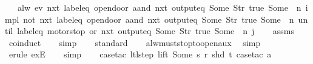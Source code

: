 \begin{isabellebody}
{\ \ \ {\isachardoublequoteopen}alw\ {\isacharparenleft}{\isacharparenleft}ev\ {\isacharparenleft}nxt\ {\isacharparenleft}{\isacharparenleft}label{\isacharunderscore}eq\ {\isacharprime}{\isacharprime}opendoor{\isacharprime}{\isacharprime}{\isacharparenright}\ aand\ {\isacharparenleft}nxt\ {\isacharparenleft}output{\isacharunderscore}eq\ {\isacharbrackleft}Some\ {\isacharparenleft}Str\ {\isacharprime}{\isacharprime}true{\isacharprime}{\isacharprime}{\isacharparenright}{\isacharcomma}\ Some\ \ n{\isacharbrackright}{\isacharparenright}{\isacharparenright}{\isacharparenright}{\isacharparenright}{\isacharparenright}\ impl\ {\isacharparenleft}{\isacharparenleft}not\ {\isacharparenleft}nxt\ {\isacharparenleft}{\isacharparenleft}label{\isacharunderscore}eq\ {\isacharprime}{\isacharprime}opendoor{\isacharprime}{\isacharprime}{\isacharparenright}\ aand\ {\isacharparenleft}nxt\ {\isacharparenleft}output{\isacharunderscore}eq\ {\isacharbrackleft}Some\ {\isacharparenleft}Str\ {\isacharprime}{\isacharprime}true{\isacharprime}{\isacharprime}{\isacharparenright}{\isacharcomma}\ Some\ \ n{\isacharbrackright}{\isacharparenright}{\isacharparenright}{\isacharparenright}{\isacharparenright}{\isacharparenright}\ until\ {\isacharparenleft}{\isacharparenleft}{\isacharparenleft}label{\isacharunderscore}eq\ {\isacharprime}{\isacharprime}motorstop{\isacharprime}{\isacharprime}{\isacharparenright}\ or\ {\isacharparenleft}nxt\ {\isacharparenleft}output{\isacharunderscore}eq\ {\isacharbrackleft}Some\ {\isacharparenleft}Str\ {\isacharprime}{\isacharprime}true{\isacharprime}{\isacharprime}{\isacharparenright}{\isacharcomma}\ Some\ \ n{\isacharbrackright}{\isacharparenright}{\isacharparenright}{\isacharparenright}{\isacharparenright}{\isacharparenright}{\isacharparenright}\ j{\isachardoublequoteclose}%
}%
%
\isadelimproof
\ \ %
\endisadelimproof
%
\isatagproof
{}\isamarkupfalse%
\ assms\ \isamarkupfalse%
\ coinduct\isanewline
\ \ \isamarkupfalse%
\ simp\isanewline
\ \ \isamarkupfalse%
\ standard\isanewline
\ \ \isamarkupfalse%
\ alw{\isacharunderscore}must{\isacharunderscore}stop{\isacharunderscore}to{\isacharunderscore}open{\isacharunderscore}aux\ \isamarkupfalse%
\ simp\isanewline
\ \ \isamarkupfalse%
\ {\isacharparenleft}erule\ exE{\isacharparenright}{\isacharplus}\isanewline
\ \ \isamarkupfalse%
\ simp\isanewline
\ \ \isamarkupfalse%
\ {\isacharparenleft}case{\isacharunderscore}tac\ {\isachardoublequoteopen}ltl{\isacharunderscore}step\ lift\ {\isacharparenleft}Some\ s{\isacharparenright}\ r\ {\isacharparenleft}shd\ t{\isacharparenright}{\isachardoublequoteclose}{\isacharcomma}\ case{\isacharunderscore}tac\ a{\isacharparenright}\isanewline

\end{isabellebody}
